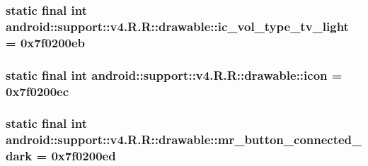 \hypertarget{classandroid_1_1support_1_1v4_1_1_r_1_1drawable_43bd16cd1bb60ad47cf5839ae89a53e5}{
\subsubsection[{ic\_\-vol\_\-type\_\-tv\_\-light}]{\setlength{\rightskip}{0pt plus 5cm}static final int android::support::v4.R.R::drawable::ic\_\-vol\_\-type\_\-tv\_\-light = 0x7f0200eb}}
\label{classandroid_1_1support_1_1v4_1_1_r_1_1drawable_43bd16cd1bb60ad47cf5839ae89a53e5}


\hypertarget{classandroid_1_1support_1_1v4_1_1_r_1_1drawable_c341330967c1c55fbcd3ce6b09cc30be}{
\subsubsection[{icon}]{\setlength{\rightskip}{0pt plus 5cm}static final int android::support::v4.R.R::drawable::icon = 0x7f0200ec}}
\label{classandroid_1_1support_1_1v4_1_1_r_1_1drawable_c341330967c1c55fbcd3ce6b09cc30be}


\hypertarget{classandroid_1_1support_1_1v4_1_1_r_1_1drawable_be124dbe642c80ec86bb3d9105dc560f}{
\subsubsection[{mr\_\-button\_\-connected\_\-dark}]{\setlength{\rightskip}{0pt plus 5cm}static final int android::support::v4.R.R::drawable::mr\_\-button\_\-connected\_\-dark = 0x7f0200ed}}
\label{classandroid_1_1support_1_1v4_1_1_r_1_1drawable_be124dbe642c80ec86bb3d9105dc560f}


